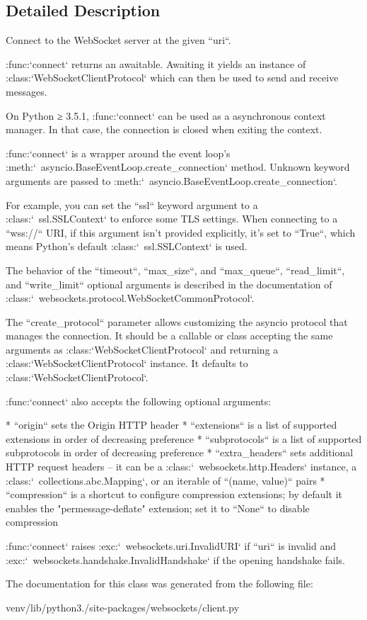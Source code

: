\subsection{Detailed Description}
\begin{DoxyVerb}Connect to the WebSocket server at the given ``uri``.

:func:`connect` returns an awaitable. Awaiting it yields an instance of
:class:`WebSocketClientProtocol` which can then be used to send and
receive messages.

On Python ≥ 3.5.1, :func:`connect` can be used as a asynchronous context
manager. In that case, the connection is closed when exiting the context.

:func:`connect` is a wrapper around the event loop's
:meth:`~asyncio.BaseEventLoop.create_connection` method. Unknown keyword
arguments are passed to :meth:`~asyncio.BaseEventLoop.create_connection`.

For example, you can set the ``ssl`` keyword argument to a
:class:`~ssl.SSLContext` to enforce some TLS settings. When connecting to
a ``wss://`` URI, if this argument isn't provided explicitly, it's set to
``True``, which means Python's default :class:`~ssl.SSLContext` is used.

The behavior of the ``timeout``, ``max_size``, and ``max_queue``,
``read_limit``, and ``write_limit`` optional arguments is described in the
documentation of :class:`~websockets.protocol.WebSocketCommonProtocol`.

The ``create_protocol`` parameter allows customizing the asyncio protocol
that manages the connection. It should be a callable or class accepting
the same arguments as :class:`WebSocketClientProtocol` and returning a
:class:`WebSocketClientProtocol` instance. It defaults to
:class:`WebSocketClientProtocol`.

:func:`connect` also accepts the following optional arguments:

* ``origin`` sets the Origin HTTP header
* ``extensions`` is a list of supported extensions in order of
  decreasing preference
* ``subprotocols`` is a list of supported subprotocols in order of
  decreasing preference
* ``extra_headers`` sets additional HTTP request headers – it can be a
  :class:`~websockets.http.Headers` instance, a
  :class:`~collections.abc.Mapping`, or an iterable of ``(name, value)``
  pairs
* ``compression`` is a shortcut to configure compression extensions;
  by default it enables the "permessage-deflate" extension; set it to
  ``None`` to disable compression

:func:`connect` raises :exc:`~websockets.uri.InvalidURI` if ``uri`` is
invalid and :exc:`~websockets.handshake.InvalidHandshake` if the opening
handshake fails.\end{DoxyVerb}
 

The documentation for this class was generated from the following file\+:\begin{DoxyCompactItemize}
\item 
venv/lib/python3./site-\/packages/websockets/client.\+py\end{DoxyCompactItemize}
